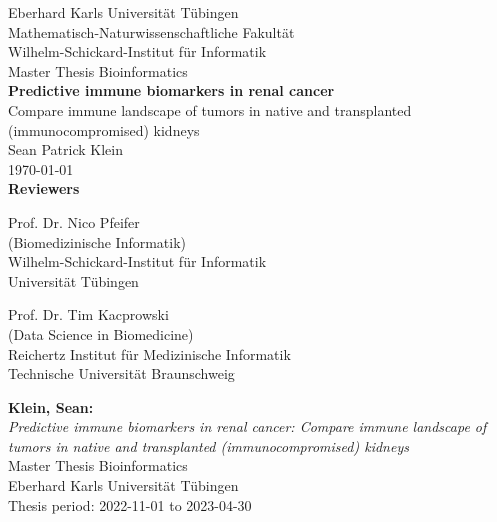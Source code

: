 \documentclass[12pt,a4paper,twoside,]{report}
\begin{document}
 
\begin{titlepage}
 \begin{center}
  {\LARGE Eberhard Karls Universit\"at T\"ubingen}\\
  {\large Mathematisch-Naturwissenschaftliche Fakult\"at \\
Wilhelm-Schickard-Institut f\"ur Informatik\\[4cm]}
  {\huge Master Thesis Bioinformatics\\[2cm]}
  {\Large\bf   Predictive immune biomarkers in renal cancer\\} 
  {\small Compare immune landscape of tumors in native and transplanted (immunocompromised) kidneys \\[1.5cm]}
 {\large Sean Patrick Klein}\\[0.5cm]
{\today}\\[4cm]
{\small\bf Reviewers}\\[0.5cm]
  \parbox{7cm}{\begin{center}{\large Prof. Dr. Nico Pfeifer}\\
   (Biomedizinische Informatik)\\
  {\footnotesize Wilhelm-Schickard-Institut f\"ur Informatik\\
	Universit\"at T\"ubingen}\end{center}}\hfill\parbox{7cm}{\begin{center}
  {\large Prof. Dr. Tim Kacprowski}\\
  (Data Science in Biomedicine)\\
  {\footnotesize Reichertz Institut f\"ur Medizinische Informatik \\
	Technische Universit\"at Braunschweig}\end{center}
 }
  \end{center}
\end{titlepage}


\thispagestyle{empty}
\vspace*{\fill}
\begin{minipage}{11.2cm}
\textbf{Klein, Sean:}\\
\emph{Predictive immune biomarkers in renal cancer: Compare immune landscape of tumors in native and transplanted (immunocompromised) kidneys}\\ Master Thesis Bioinformatics\\
Eberhard Karls Universit\"at T\"ubingen\\
Thesis period: 2022-11-01 to 2023-04-30
\end{minipage}
\newpage
\end{document}
